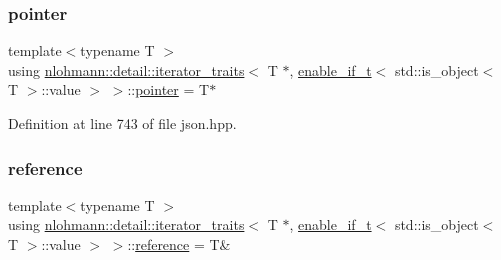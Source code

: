\subsubsection{\texorpdfstring{pointer}{pointer}}
{\footnotesize\ttfamily template$<$typename T $>$ \\
using \mbox{\hyperlink{structnlohmann_1_1detail_1_1iterator__traits}{nlohmann\+::detail\+::iterator\+\_\+traits}}$<$ T $\ast$, \mbox{\hyperlink{namespacenlohmann_1_1detail_a02bcbc878bee413f25b985ada771aa9c}{enable\+\_\+if\+\_\+t}}$<$ std\+::is\+\_\+object$<$ T $>$\+::value $>$ $>$\+::\mbox{\hyperlink{structnlohmann_1_1detail_1_1iterator__traits_3_01_t_01_5_00_01enable__if__t_3_01std_1_1is__objec8d960665487688165530972cda4f1bea_a33ee9a1beb8ee099f989fd4af15178a5}{pointer}} =  T$\ast$}



Definition at line 743 of file json.\+hpp.

\mbox{\label{structnlohmann_1_1detail_1_1iterator__traits_3_01_t_01_5_00_01enable__if__t_3_01std_1_1is__objec8d960665487688165530972cda4f1bea_a0809c5949d22f08a993231d2fdf285f0}} 
\subsubsection{\texorpdfstring{reference}{reference}}
{\footnotesize\ttfamily template$<$typename T $>$ \\
using \mbox{\hyperlink{structnlohmann_1_1detail_1_1iterator__traits}{nlohmann\+::detail\+::iterator\+\_\+traits}}$<$ T $\ast$, \mbox{\hyperlink{namespacenlohmann_1_1detail_a02bcbc878bee413f25b985ada771aa9c}{enable\+\_\+if\+\_\+t}}$<$ std\+::is\+\_\+object$<$ T $>$\+::value $>$ $>$\+::\mbox{\hyperlink{structnlohmann_1_1detail_1_1iterator__traits_3_01_t_01_5_00_01enable__if__t_3_01std_1_1is__objec8d960665487688165530972cda4f1bea_a0809c5949d22f08a993231d2fdf285f0}{reference}} =  T\&}



